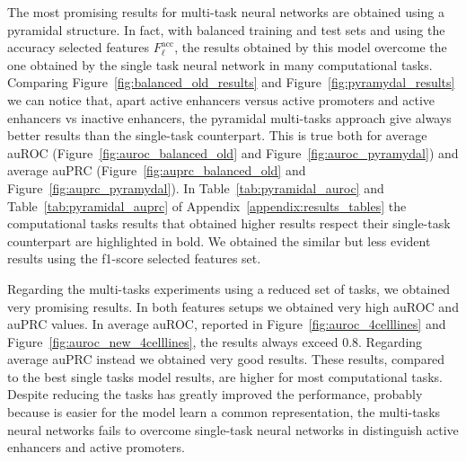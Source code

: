 The most promising results for multi-task neural networks are obtained using a pyramidal structure. In fact, with balanced training and test sets and using the accuracy selected features $F_\ell^{\textrm{acc}}$, the results obtained by this model overcome the one obtained by the single task neural network in many computational tasks. Comparing Figure~\ref{fig:balanced_old_results} and Figure~\ref{fig:pyramydal_results} we can notice that, apart active enhancers versus active promoters and active enhancers vs inactive enhancers, the pyramidal multi-tasks approach give always better results than the single-task counterpart. This is true both for average auROC (Figure~\ref{fig:auroc_balanced_old} and Figure~\ref{fig:auroc_pyramydal}) and average auPRC (Figure~\ref{fig:auprc_balanced_old} and Figure~\ref{fig:auprc_pyramydal}). In Table~\ref{tab:pyramidal_auroc} and Table~\ref{tab:pyramidal_auprc} of Appendix~\ref{appendix:results_tables} the computational tasks results that obtained higher results respect their single-task counterpart are highlighted in bold. We obtained the similar but less evident results using the f1-score selected features set. 

Regarding the multi-tasks experiments using a reduced set of tasks, we obtained very promising results. In both features setups we obtained very high auROC and auPRC values. In average auROC, reported in Figure~\ref{fig:auroc_4celllines} and Figure~\ref{fig:auroc_new_4celllines}, the results always exceed 0.8. Regarding average auPRC instead we obtained very good results. These results, compared to the best single tasks model results, are higher for most computational tasks. Despite reducing the tasks has greatly improved the performance, probably because is easier for the model learn a common representation, the multi-tasks neural networks fails to overcome single-task neural networks in distinguish active enhancers and active promoters. 